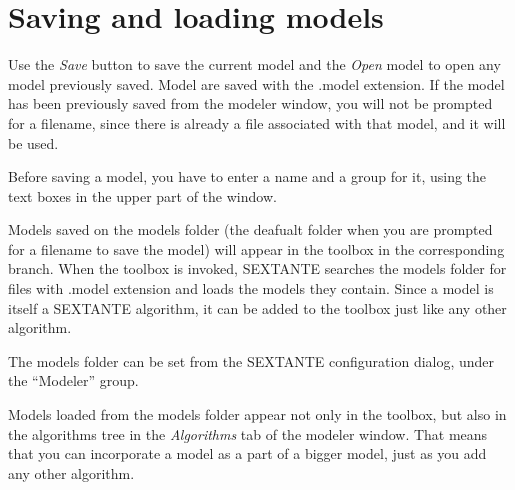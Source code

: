 %
%
%
%


\section{Saving and loading models}


Use the \emph{Save} button to save the current model and the \emph{Open} model to open any model previously saved. Model are saved with the .model extension. If the model has been previously saved from the modeler window, you will not be prompted for a filename, since there is already a file associated with that model, and it will be used.

Before saving a model, you have to enter a name and a group for it, using the text boxes in the upper part of the window.

Models saved on the models folder (the deafualt folder when you are prompted for a filename to save the model) will appear in the toolbox in the corresponding branch. When the toolbox is invoked, SEXTANTE searches the models folder for files with .model extension and loads the models they contain. Since a model is itself a SEXTANTE algorithm, it can be added to the toolbox just like any other algorithm.

The models folder can be set from the SEXTANTE configuration dialog, under the ``Modeler'' group.

Models loaded from the models folder appear not only in the toolbox, but also in the algorithms tree in the \emph{Algorithms} tab of the modeler window. That means that you can incorporate a model as a part of a bigger model, just as you add any other algorithm. 

